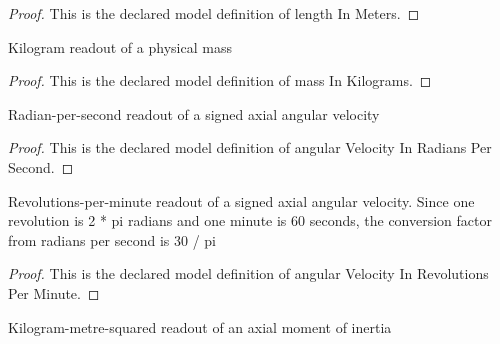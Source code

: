 \begin{proof}
  This is the declared model definition of length In Meters.
\end{proof}
\begin{definition}
  \label{def:physics:phyx-mini-0712:phyxminiproblems-problemphyxmini0712-massinkilograms}
  Kilogram readout of a physical mass
\end{definition}
\begin{proof}
  This is the declared model definition of mass In Kilograms.
\end{proof}
\begin{definition}
  \label{def:physics:phyx-mini-0712:phyxminiproblems-problemphyxmini0712-angularvelocityinradianspersecond}
  Radian-per-second readout of a signed axial angular velocity
\end{definition}
\begin{proof}
  This is the declared model definition of angular Velocity In Radians Per Second.
\end{proof}
\begin{definition}
  \label{def:physics:phyx-mini-0712:phyxminiproblems-problemphyxmini0712-angularvelocityinrevolutionsperminute}
  Revolutions-per-minute readout of a signed axial angular velocity. Since one revolution is 2 * pi radians and one minute is 60 seconds, the conversion factor from radians per second is 30 / pi
\end{definition}
\begin{proof}
  This is the declared model definition of angular Velocity In Revolutions Per Minute.
\end{proof}
\begin{definition}
  \label{def:physics:phyx-mini-0712:phyxminiproblems-problemphyxmini0712-momentofinertiainkilogrammeterssquared}
  Kilogram-metre-squared readout of an axial moment of inertia
\end{definition}
